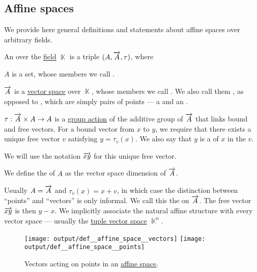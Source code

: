 \subsection{Affine spaces}\label{subsec:affine_spaces}

We provide here general definitions and statements about affine spaces over arbitrary fields.

\begin{definition}\label{def:affine_space}
  An  over the \hyperref[def:field]{field} \( \BbbK \) is a triple \( (A, \overrightarrow{A}, \tau) \), where
  \begin{thmenum}[series=def:affine_space]
     \( A \) is a set, whose members we call .

     \( \overrightarrow{A} \) is a \hyperref[def:vector_space]{vector space} over \( \BbbK \), whose members we call . We also call them , as opposed to , which are simply pairs of points --- a  and an .

     \( \tau: \overrightarrow{A} \times A \to A \) is a \hyperref[def:group_action]{group action} of the additive group of \( \overrightarrow{A} \) that links bound and free vectors. For a bound vector from \( x \) to \( y \), we require that there exists a unique free vector \( v \) satisfying \( y = \tau_v(x) \). We also say that \( y \) is a  of \( x \) in the  \( v \).

    We will use the notation \( \overrightarrow{xy} \) for this unique free vector.
  \end{thmenum}

  We define the  of \( A \) as the vector space dimension of \( \overrightarrow{A} \).

  Usually \( A = \overrightarrow{A} \) and \( \tau_v(x) = x + v \), in which case the distinction between \enquote{points} and \enquote{vectors} is only informal. We call this the  on \( \overrightarrow{A} \). The free vector \( \overrightarrow{xy} \) is then \( y - x \). We implicitly associate the natural affine structure with every vector space --- usually the \hyperref[def:sequence_space]{tuple vector space} \( \BbbK^n \).

  \begin{figure}[!ht]
    \hfill
    \hfill
    \texttt{[image: output/def\_\_affine\_space\_\_vectors]}
    \hfill
    \texttt{[image: output/def\_\_affine\_space\_\_points]}
    \hfill
    \caption{Vectors acting on points in an \hyperref[def:affine_space]{affine space}.}\label{fig:def:affine_space}
  \end{figure}
\end{definition}

